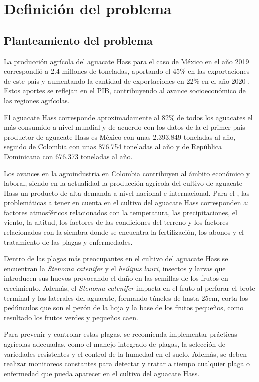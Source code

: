 \section{Definición del problema}

\subsection{Planteamiento del problema}
La producción agrícola del aguacate Hass para el caso de México en el año 2019 correspondió a 2.4 millones de toneladas, aportando el 45\% en las exportaciones de este país y aumentando la cantidad de exportaciones en 22\% en el año 2020 \citep{cruz2022competitividad}. Estos aportes se reflejan en el PIB, contribuyendo al avance socioeconómico de las regiones agrícolas.

El aguacate Hass corresponde aproximadamente al 82\% de todos los aguacates el más consumido a nivel mundial y de acuerdo con los datos de la \citet{faostat2021hacia} el primer país productor de aguacate Hass es México con unas 2.393.849 toneladas al año, seguido de Colombia con unas 876.754 toneladas al año y de República Dominicana con 676.373 toneladas al año.

Los avances en la agroindustria en Colombia contribuyen al ámbito económico y laboral, siendo en la actualidad la producción agrícola del cultivo de aguacate Hass un producto de alta demanda a nivel nacional e internacional. Para el \citet{dane2016cultivo}, las problemáticas a tener en cuenta en el cultivo del aguacate Hass corresponden a: factores atmosféricos relacionados con la temperatura, las precipitaciones, el viento, la altitud, los factores de las condiciones del terreno y los factores relacionados con la siembra donde se encuentra la fertilización, los abonos y el tratamiento de las plagas y enfermedades.

Dentro de las plagas más preocupantes en el cultivo del aguacate Hass se encuentran la \textit{Stenoma catenifer} y el \textit{heilipus lauri}, insectos y larvas que introducen sus huevos provocando el daño en las semillas de los frutos en crecimiento. Además, el \textit{Stenoma catenifer} impacta en el fruto al perforar el brote terminal y los laterales del aguacate, formando túneles de hasta 25cm, corta los pedúnculos que son el pezón de la hoja y la base de los frutos pequeños, como resultado los frutos verdes y pequeños caen.

Para prevenir y controlar estas plagas, se recomienda implementar prácticas agrícolas adecuadas, como el manejo integrado de plagas, la selección de variedades resistentes y el control de la humedad en el suelo. Además, se deben realizar monitoreos constantes para detectar y tratar a tiempo cualquier plaga o enfermedad que pueda aparecer en el cultivo del aguacate Hass.

